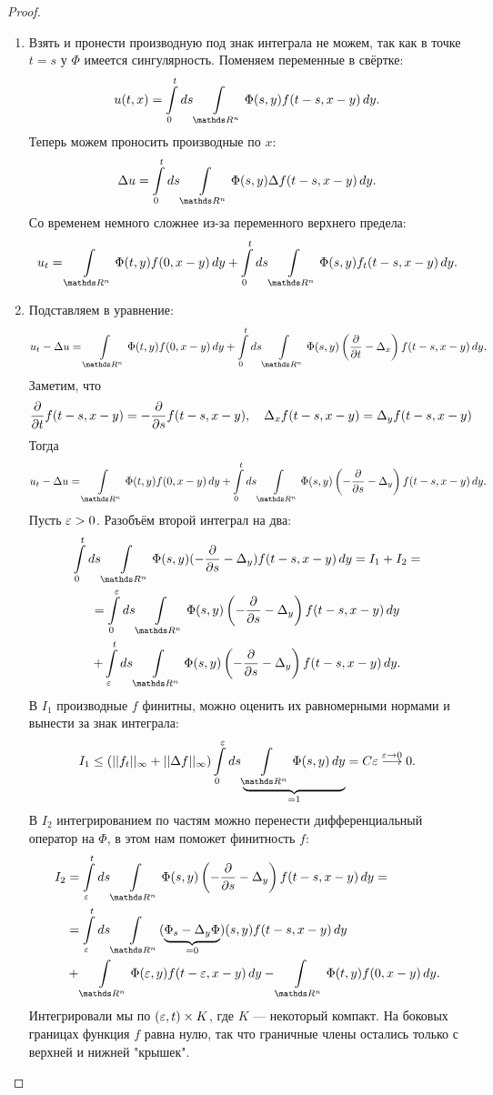 \begin{proof}

\begin{enumerate}
\item Взять и пронести производную под знак интеграла не можем, так как в точке $t = s$ у $\Phi$ имеется сингулярность. Поменяем переменные в свёртке:
$$ u(t, x) = \int \limits_0^t ds \int \limits_{\real^n} \Phi(s,y) f(t-s, x-y) \,dy.$$
Теперь можем проносить производные по $x$:
$$ \Delta u = \int \limits_0^t ds \int \limits_{\real^n} \Phi(s,y) \Delta f (t-s, x-y) \, dy.$$
Со временем немного сложнее из-за переменного верхнего предела:
$$  u_t = \int \limits_{\real^n} \Phi(t,y) f(0, x-y) \, dy + \int \limits_0^t ds \int \limits_{\real^n} \Phi(s,y) f_t(t-s,x-y) \, dy.$$
\item Подставляем в уравнение:
$$ u_t - \Delta u = \int \limits_{\real^n} \Phi(t,y) f(0, x-y) \, dy +  \int \limits_0^t ds \int \limits_{\real^n} \Phi(s,y) \left( \pder{t} - \Delta_x \right) f(t-s, x-y) \, dy.$$
Заметим, что
$$ \frac{\partial}{\partial t} f(t-s,x-y) = - \frac{\partial}{\partial s} f(t-s, x-y), \quad \Delta_x f(t-s, x-y) = \Delta_y f(t-s, x-y)$$
Тогда
$$ u_t - \Delta u = \int \limits_{\real^n} \Phi(t,y) f(0, x-y) \, dy +  \int \limits_0^t ds \int \limits_{\real^n} \Phi(s,y) \left( -\pder{s} - \Delta_y \right) f(t-s, x-y) \, dy.$$
Пусть $\varepsilon > 0$. Разобъём второй интеграл на два:
\begin{gather*}
\int \limits_0^t ds \int \limits_{\real^n} \Phi(s,y) (-\pder{s} - \Delta_y) f(t-s, x-y) \, dy = I_1 + I_2 = \\ 
= \int \limits_0^\eps ds \int \limits_{\real^n} \Phi(s,y) \left(-\pder{s} - \Delta_y \right) f(t-s, x-y) \, dy \\
+ \int \limits_\eps^t ds \int \limits_{\real^n} \Phi(s,y) \left( -\pder{s} - \Delta_y \right) f(t-s, x-y) \, dy.
\end{gather*}
В $I_1$ производные $f$ финитны, можно оценить их равномерными нормами и вынести за знак интеграла:
$$I_1 \leq (|| f_t ||_\infty + || \Delta f ||_\infty) \int \limits_0^\eps ds \underbrace {\int \limits_{\real^n} \Phi(s,y) \, dy }_{=1} = C \eps \stackrel {\eps \to 0} {\longrightarrow} 0. $$
В $I_2$ интегрированием по частям можно перенести дифференциальный оператор на $\Phi$, в этом нам поможет финитность $f$:
\begin{align*}
	I_2 &= \int \limits_\eps^t ds \int \limits_{\real^n} \Phi(s,y) \left( - \pder{s} - \Delta_y \right) f(t-s, x-y) \, dy = \\
	&= \int \limits_\eps^t ds \int \limits_{\real^n} (\underbrace {\Phi_s - \Delta_y\Phi}_{=0})(s,y) f(t-s, x-y) \, dy \\
	& +  \int \limits_{\real^n} \Phi(\eps, y) f(t - \eps, x-y) \, dy - \int \limits_{\real^n} \Phi(t, y) f(0, x-y) \, dy.
\end{align*} 
Интегрировали мы по $(\varepsilon, t) \times K$, где $K$ --- некоторый компакт. На боковых границах функция $f$ равна нулю, так что граничные члены остались только с верхней и нижней "крышек".


\end{enumerate}
\end{proof}
